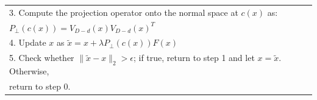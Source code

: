 \documentclass[aos,preprint]{imsart}
\theoremstyle{remark}
\begin{document}
\begin{appendix}
\begin{table}[t]
{\begin{tabular}{l}
\hspace{1cm} %
3. Compute the projection operator onto the normal space at $c(x)$ as: \\
 \hspace{3.5cm} ${P}_{\perp}(c(x)) = V_{D-d}(x)V_{D-d}(x)^T$\\
\hspace{1cm} 4. Update $x$ as $\tilde{x} = x + \lambda { P}_{\perp}(c(x)) F(x)$\\ 
\hspace{1cm} 5. Check whether $\| \tilde{x} -x\|_2 > \epsilon$; if true, return to step 1 and let $x = \tilde{x}$. Otherwise, \\
\hspace{1.5cm}return to step 0.\\
\hline
\end{tabular}}
\label{algorithm}
\end{table}


\end{appendix}
\end{document}
